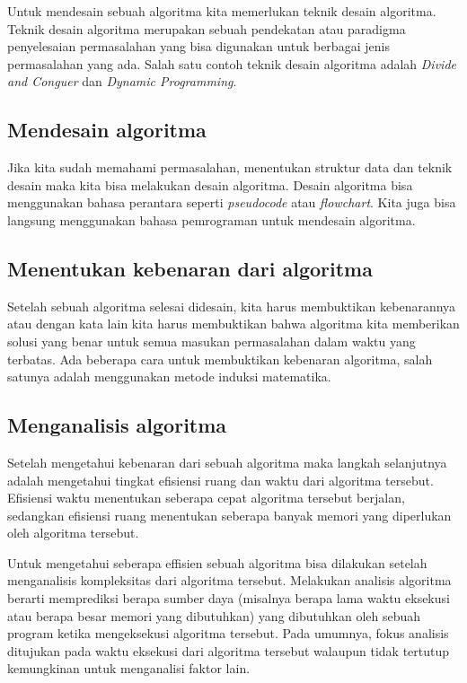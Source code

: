 Untuk mendesain sebuah algoritma kita memerlukan teknik desain algoritma. Teknik desain algoritma merupakan sebuah pendekatan atau paradigma penyelesaian permasalahan yang bisa digunakan untuk berbagai jenis permasalahan yang ada. Salah satu contoh teknik desain algoritma adalah \textit{Divide and Conguer} dan \textit{Dynamic Programming}.

\subsection{Mendesain algoritma}
Jika kita sudah memahami permasalahan, menentukan struktur data dan teknik desain maka kita bisa melakukan desain algoritma. Desain algoritma bisa menggunakan bahasa perantara seperti \textit{pseudocode} atau \textit{flowchart}. Kita juga bisa langsung menggunakan bahasa pemrograman untuk mendesain algoritma. 

\subsection{Menentukan kebenaran dari algoritma}
Setelah sebuah algoritma selesai didesain, kita harus membuktikan kebenarannya atau dengan kata lain kita harus membuktikan bahwa algoritma kita memberikan solusi yang benar untuk semua masukan permasalahan dalam waktu yang terbatas. Ada beberapa cara untuk membuktikan kebenaran algoritma, salah satunya adalah menggunakan metode induksi matematika.

\subsection{Menganalisis algoritma}
Setelah mengetahui kebenaran dari sebuah algoritma maka langkah selanjutnya adalah mengetahui tingkat efisiensi ruang dan waktu dari algoritma tersebut. Efisiensi waktu menentukan seberapa cepat algoritma tersebut berjalan, sedangkan efisiensi ruang menentukan seberapa banyak memori yang diperlukan oleh algoritma tersebut. 

Untuk mengetahui seberapa effisien sebuah algoritma bisa dilakukan setelah menganalisis kompleksitas dari algoritma tersebut. Melakukan analisis algoritma berarti memprediksi berapa sumber daya (misalnya berapa lama waktu eksekusi atau berapa besar memori yang dibutuhkan) yang dibutuhkan oleh sebuah program ketika mengeksekusi algoritma tersebut. Pada umumnya, fokus analisis ditujukan pada waktu eksekusi dari algoritma tersebut walaupun tidak tertutup kemungkinan untuk menganalisi faktor lain.

